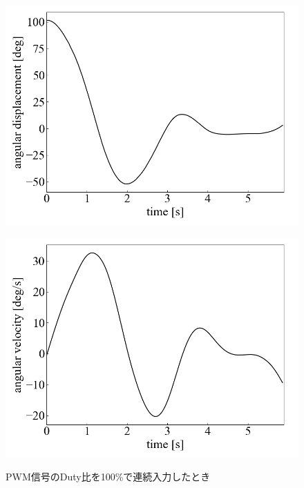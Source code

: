   \begin{figure}[h]
	\centering
	\begin{minipage}{0.43\columnwidth}
	  \centering
	  \includegraphics[width=\columnwidth]{./figure/duty100deg.png}
	  \label{fig:duty100deg}
	\end{minipage}
	\hspace{5mm}
	\begin{minipage}{0.43\columnwidth}
	  \centering
	  \includegraphics[width=\columnwidth]{./figure/duty100degpers.png}
	  \label{fig:duty100degpers}
	\end{minipage}
	\caption{PWM信号のDuty比を100\%で連続入力したとき}
  \end{figure}

